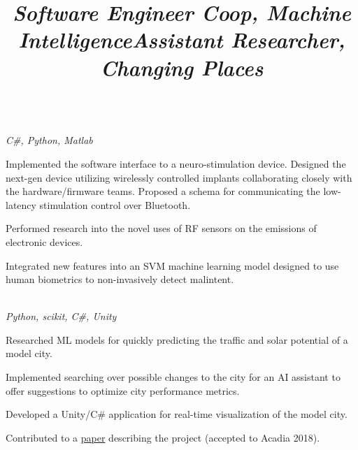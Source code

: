 \documentclass[margin,line,11pt,letterpaper]{res}
\let\oldsection\section
\renewcommand{\section}[1]{\vspace{-2mm}\oldsection{\small\sc {#1}}}
\begin{document}
\begin{resume}
    \title{\textit{Software Engineer Coop, Machine Intelligence}}
    \begin{position}
        \vspace{-3mm}\\
        \emph{C\#, Python, Matlab}
        \begin{list2}
            \item Implemented the software interface to a neuro-stimulation device.
            Designed the next-gen device utilizing wirelessly controlled implants collaborating closely with the hardware/firmware teams. 
            Proposed a schema for communicating the low-latency stimulation control over Bluetooth.
            \item Performed research into the novel uses of RF sensors on the emissions of electronic devices.
            \item Integrated new features into an SVM machine learning model designed to use human biometrics to non-invasively detect malintent.
        \end{list2}
    \end{position}
    
    \title{\textit{Assistant Researcher, Changing Places}}
    \begin{position}
        \vspace{-3mm}\\
        \emph{Python, scikit, C\#, Unity}
        \begin{list2}
            \item Researched ML models for quickly predicting the traffic and solar potential of a model city.
            \item Implemented searching over possible changes to the city for an AI assistant to offer suggestions to optimize city performance metrics.
            \item Developed a Unity/C\# application for real-time visualization of the model city.
            \item Contributed to a \href{https://bit.ly/2xqEsnW}{paper} describing the project (accepted to Acadia 2018).
        \end{list2}
    \end{position}

    \section{Projects + Competitions}
    

\end{resume}
\end{document}

